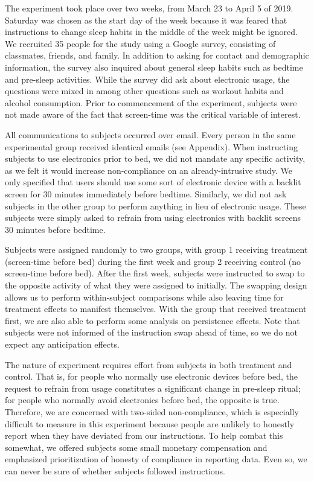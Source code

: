 \documentclass[12pt,]{article}
\begin{document}
The experiment took place over two weeks, from March 23 to April 5 of
2019. Saturday was chosen as the start day of the week because it was
feared that instructions to change sleep habits in the middle of the
week might be ignored. We recruited 35 people for the study using a
Google survey, consisting of classmates, friends, and family. In
addition to asking for contact and demographic information, the survey
also inquired about general sleep habits such as bedtime and pre-sleep
activities. While the survey did ask about electronic usage, the
questions were mixed in among other questions such as workout habits and
alcohol consumption. Prior to commencement of the experiment, subjects
were not made aware of the fact that screen-time was the critical
variable of interest.

All communications to subjects occurred over email. Every person in the
same experimental group received identical emails (see Appendix). When
instructing subjects to use electronics prior to bed, we did not mandate
any specific activity, as we felt it would increase non-compliance on an
already-intrusive study. We only specified that users should use some
sort of electronic device with a backlit screen for 30 minutes
immediately before bedtime. Similarly, we did not ask subjects in the
other group to perform anything in lieu of electronic usage. These
subjects were simply asked to refrain from using electronics with
backlit screens 30 minutes before bedtime.

Subjects were assigned randomly to two groups, with group 1 receiving
treatment (screen-time before bed) during the first week and group 2
receiving control (no screen-time before bed). After the first week,
subjects were instructed to swap to the opposite activity of what they
were assigned to initially. The swapping design allows us to perform
within-subject comparisons while also leaving time for treatment effects
to manifest themselves. With the group that received treatment first, we
are also able to perform some analysis on persistence effects. Note that
subjects were not informed of the instruction swap ahead of time, so we
do not expect any anticipation effects.

The nature of experiment requires effort from subjects in both treatment
and control. That is, for people who normally use electronic devices
before bed, the request to refrain from usage constitutes a significant
change in pre-sleep ritual; for people who normally avoid electronics
before bed, the opposite is true. Therefore, we are concerned with
two-sided non-compliance, which is especially difficult to measure in
this experiment because people are unlikely to honestly report when they
have deviated from our instructions. To help combat this somewhat, we
offered subjects some small monetary compensation and emphasized
prioritization of honesty of compliance in reporting data. Even so, we
can never be sure of whether subjects followed instructions.
\end{document}
